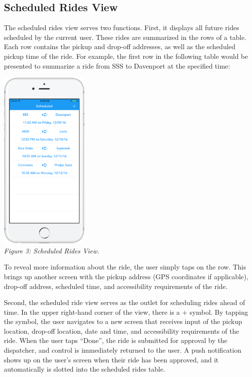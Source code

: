 \documentclass[12pt, a4paper]{article}
\begin{document}
\begin{multicols*}{2}
\subsection{Scheduled Rides View}
The scheduled rides view serves two functions. First, it displays all future rides scheduled by the current user. These rides are summarized in the rows of a table. Each row contains the pickup and drop-off addresses, as well as the scheduled pickup time of the ride. For example, the first row in the following table would be presented to summarize a ride from SSS to Davenport at the specified time:
\begin{center}
	\includegraphics[width=0.33\textwidth]{screenshot-3.png}\\
	\textit{Figure 3: Scheduled Rides View.}
\end{center}
To reveal more information about the ride, the user simply taps on the row. This brings up another screen with the pickup address (GPS coordinates if applicable), drop-off address, scheduled time, and accessibility requirements of the ride.

Second, the scheduled ride view serves as the outlet for scheduling rides ahead of time. In the upper right-hand corner of the view, there is a $+$ symbol. By tapping the symbol, the user navigates to a new screen that receives input of the pickup location, drop-off location, date and time, and accessibility requirements of the ride. When the user taps ``Done'', the ride is submitted for approval by the dispatcher, and control is immediately returned to the user. A push notification shows up on the user's screen when their ride has been approved, and it automatically is slotted into the scheduled rides table.

\end{multicols*}
\end{document}
